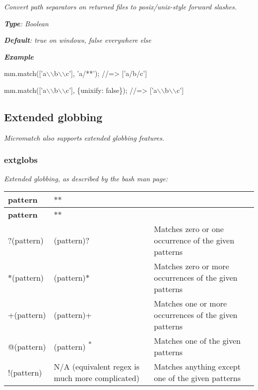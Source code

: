 {\itshape }

{\itshape Convert path separators on returned files to posix/unix-\/style forward slashes.}

{\itshape {\bfseries Type}\+: {\ttfamily Boolean}}

{\itshape {\bfseries Default}\+: {\ttfamily true} on windows, {\ttfamily false} everywhere else}

{\itshape {\bfseries Example}}

{\itshape 
\begin{DoxyCode}
mm.match(['a\(\backslash\)\(\backslash\)b\(\backslash\)\(\backslash\)c'], 'a/**');
//=> ['a/b/c']

mm.match(['a\(\backslash\)\(\backslash\)b\(\backslash\)\(\backslash\)c'], \{unixify: false\});
//=> ['a\(\backslash\)\(\backslash\)b\(\backslash\)\(\backslash\)c']
\end{DoxyCode}
}

{\itshape \subsection*{Extended globbing}}

{\itshape }

{\itshape Micromatch also supports extended globbing features.}

{\itshape \subsubsection*{extglobs}}

{\itshape }

{\itshape Extended globbing, as described by the bash man page\+:}

{\itshape \tabulinesep=1mm
\begin{longtabu} spread 0pt [c]{*{3}{|X[-1]}|}
\hline
\rowcolor{\tableheadbgcolor}\textbf{ {\bfseries pattern}  }&\\
\endfirsthead
\hline
\endfoot
\hline
\rowcolor{\tableheadbgcolor}\textbf{ {\bfseries pattern}  }&\\
\endhead
{\ttfamily ?(pattern)}  &{\ttfamily (pattern)?}  &Matches zero or one occurrence of the given patterns   \\
{\ttfamily $\ast$(pattern)}  &{\ttfamily (pattern)$\ast$}  &Matches zero or more occurrences of the given patterns   \\
{\ttfamily +(pattern)}  &{\ttfamily (pattern)+}  &Matches one or more occurrences of the given patterns   \\
{\ttfamily @(pattern)}  &{\ttfamily (pattern)} \textsuperscript{$\ast$}  &Matches one of the given patterns   \\
{\ttfamily !(pattern)}  &N/A (equivalent regex is much more complicated)  &Matches anything except one of the given patterns   \\
\end{longtabu}
}

